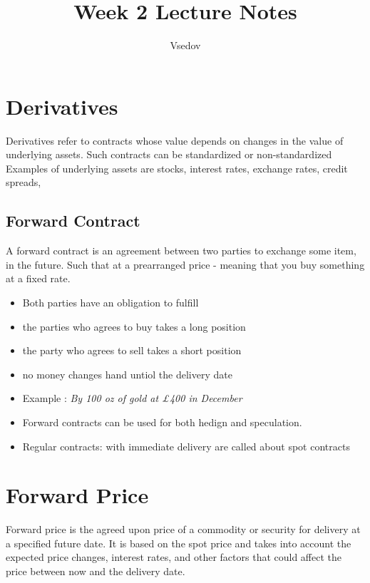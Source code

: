\documentclass{article}
\title{Week 2 Lecture Notes}
\author{Vsedov}
\theoremstyle{mytheoremstyle}
\theoremstyle{mytheoremstyle}
\theoremstyle{myproblemstyle}
\begin{document}
\maketitle

\tableofcontents
\newpage

\section{Derivatives}

\begin{definition}[Derivatives]
	Derivatives refer to contracts whose value depends on changes in the value of underlying assets. Such contracts can be standardized or non-standardized
	Examples of underlying assets are stocks, interest rates, exchange rates, credit spreads,
\end{definition}

\subsection{Forward Contract}
A forward contract is an agreement between two parties to exchange some item, in the future. Such that at a prearranged price - meaning that you buy something at a fixed rate.
\begin{itemize}
	\item Both parties have an obligation to fulfill
	\item the parties who agrees to buy takes a long position
	\item the party who agrees to sell takes a short position
	\item no money changes hand untiol the delivery date
	\item Example : \textit{By 100 oz of gold at £400 in December}
\end{itemize}

\begin{itemize}
	\item Forward contracts can be used for both hedign and speculation.

	\item Regular contracts: with immediate delivery are called about spot contracts
\end{itemize}

\section{Forward Price}

\begin{definition}
	Forward price is the agreed upon price of a commodity or security for delivery at a specified future date. It is based on the spot price and takes into account the expected price changes, interest rates, and other factors that could affect the price between now and the delivery date.
\end{definition}
\end{document}
